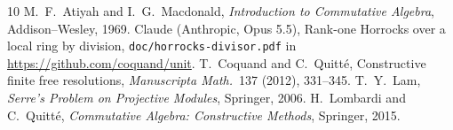 \documentclass[11pt]{amsart}
\theoremstyle{remark}
\begin{document}
\begin{thebibliography}{10}
 M.~F.~Atiyah and I.~G.~Macdonald, \emph{Introduction to
Commutative Algebra}, Addison--Wesley, 1969.
 Claude (Anthropic, Opus 5.5), Rank-one Horrocks over a local
ring by division, \texttt{doc/horrocks-divisor.pdf} in \url{https://github.com/coquand/unit}.
 T.~Coquand and C.~Quitt\'e, Constructive finite free
resolutions, \emph{Manuscripta Math.}\ 137 (2012), 331--345.
 T.~Y.~Lam, \emph{Serre's Problem on Projective Modules},
Springer, 2006.
 H.~Lombardi and C.~Quitt\'e, \emph{Commutative Algebra:
Constructive Methods}, Springer, 2015.
\end{thebibliography}
\end{document}
